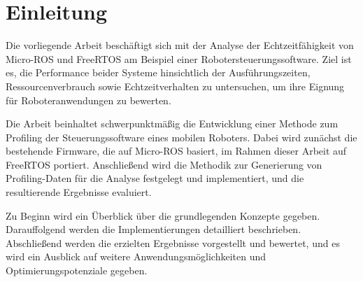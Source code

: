 \section*{Einleitung}

Die vorliegende Arbeit beschäftigt sich mit der Analyse der Echtzeitfähigkeit
von Micro-ROS und FreeRTOS am Beispiel einer Robotersteuerungssoftware. Ziel ist
es, die Performance beider Systeme hinsichtlich der Ausführungszeiten,
Ressourcenverbrauch sowie Echtzeitverhalten zu untersuchen, um ihre Eignung für
Roboteranwendungen zu bewerten.

Die Arbeit beinhaltet schwerpunktmäßig die Entwicklung einer Methode zum
Profiling der Steuerungssoftware eines mobilen Roboters. Dabei wird zunächst die
bestehende Firmware, die auf Micro-ROS basiert, im Rahmen dieser Arbeit auf
FreeRTOS portiert. Anschließend wird die Methodik zur Generierung von
Profiling-Daten für die Analyse festgelegt und implementiert, und die
resultierende Ergebnisse evaluiert.

Zu Beginn wird ein Überblick über die grundlegenden Konzepte gegeben.
Darauffolgend werden die Implementierungen detailliert beschrieben. Abschließend
werden die erzielten Ergebnisse vorgestellt und bewertet, und es wird ein
Ausblick auf weitere Anwendungsmöglichkeiten und Optimierungspotenziale gegeben.
